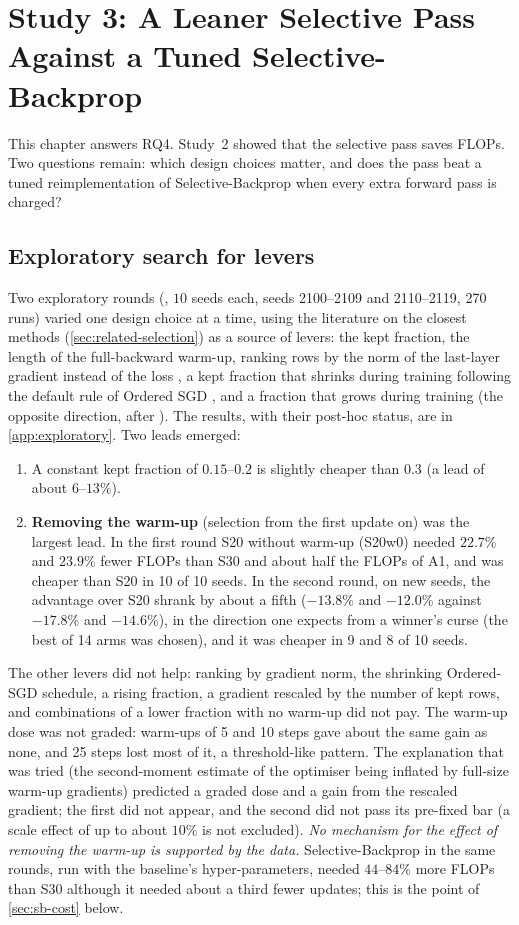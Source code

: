 \chapter{Study 3: A Leaner Selective Pass Against a Tuned Selective-Backprop}\label{ch:study3}

This chapter answers RQ4. Study~2 showed that the selective pass saves FLOPs. Two questions remain: which design choices matter, and does the pass beat a tuned reimplementation of Selective-Backprop when every extra forward pass is charged?

\section{Exploratory search for levers}\label{sec:s3-explore}
Two exploratory rounds (\tierE{}, $10$ seeds each, seeds 2100--2109 and 2110--2119, 270 runs) varied one design choice at a time, using the literature on the closest methods (\cref{sec:related-selection}) as a source of levers: the kept fraction, the length of the full-backward warm-up, ranking rows by the norm of the last-layer gradient instead of the loss \citep{katharopoulos2018not}, a kept fraction that shrinks during training following the default rule of Ordered SGD \citep{kawaguchi2020ordered}, and a fraction that grows during training (the opposite direction, after \citealt{loshchilov2016online}). The results, with their post-hoc status, are in \cref{app:exploratory}. Two leads emerged:
\begin{enumerate}
\item A constant kept fraction of $0.15$--$0.2$ is slightly cheaper than $0.3$ (a lead of about $6$--$13\%$).
\item \textbf{Removing the warm-up} (selection from the first update on) was the largest lead. In the first round S20 without warm-up (S20w0) needed $22.7\%$ and $23.9\%$ fewer FLOPs than S30 and about half the FLOPs of A1, and was cheaper than S20 in 10 of 10 seeds. In the second round, on new seeds, the advantage over S20 shrank by about a fifth ($-13.8\%$ and $-12.0\%$ against $-17.8\%$ and $-14.6\%$), in the direction one expects from a winner's curse (the best of 14 arms was chosen), and it was cheaper in 9 and 8 of 10 seeds.
\end{enumerate}
The other levers did not help: ranking by gradient norm, the shrinking Ordered-SGD schedule, a rising fraction, a gradient rescaled by the number of kept rows, and combinations of a lower fraction with no warm-up did not pay. The warm-up dose was not graded: warm-ups of 5 and 10 steps gave about the same gain as none, and 25 steps lost most of it, a threshold-like pattern. The explanation that was tried (the second-moment estimate of the optimiser being inflated by full-size warm-up gradients) predicted a graded dose and a gain from the rescaled gradient; the first did not appear, and the second did not pass its pre-fixed bar (a scale effect of up to about $10\%$ is not excluded). \emph{No mechanism for the effect of removing the warm-up is supported by the data.} Selective-Backprop in the same rounds, run with the baseline's hyper-parameters, needed $44$--$84\%$ more FLOPs than S30 although it needed about a third fewer updates; this is the point of \cref{sec:sb-cost} below.

